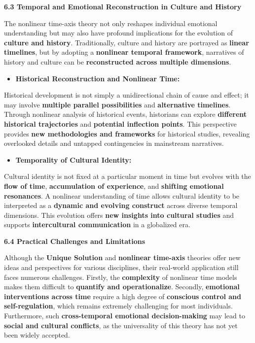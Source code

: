 \documentclass[
]{article}
\begin{document}
\textbf{6.3 Temporal and Emotional Reconstruction in Culture and
History}

The nonlinear time-axis theory not only reshapes individual emotional
understanding but may also have profound implications for the evolution
of \textbf{culture and history}. Traditionally, culture and history are
portrayed as \textbf{linear timelines}, but by adopting a
\textbf{nonlinear temporal framework}, narratives of history and culture
can be \textbf{reconstructed across multiple dimensions}.

\begin{itemize}
\item
  \textbf{Historical Reconstruction and Nonlinear Time:}
\end{itemize}

Historical development is not simply a unidirectional chain of cause and
effect; it may involve \textbf{multiple parallel possibilities} and
\textbf{alternative timelines}. Through nonlinear analysis of historical
events, historians can explore \textbf{different historical
trajectories} and \textbf{potential inflection points}. This perspective
provides \textbf{new methodologies and frameworks} for historical
studies, revealing overlooked details and untapped contingencies in
mainstream narratives.

\begin{itemize}
\item
  \textbf{Temporality of Cultural Identity:}
\end{itemize}

Cultural identity is not fixed at a particular moment in time but
evolves with the \textbf{flow of time}, \textbf{accumulation of
experience}, and \textbf{shifting emotional resonances}. A nonlinear
understanding of time allows cultural identity to be interpreted as a
\textbf{dynamic and evolving construct} across diverse temporal
dimensions. This evolution offers \textbf{new insights into cultural
studies} and supports \textbf{intercultural communication} in a
globalized era.

\textbf{6.4 Practical Challenges and Limitations}

Although the \textbf{Unique Solution} and \textbf{nonlinear time-axis}
theories offer new ideas and perspectives for various disciplines, their
real-world application still faces numerous challenges. Firstly, the
\textbf{complexity} of nonlinear time models makes them difficult to
\textbf{quantify and operationalize}. Secondly, \textbf{emotional
interventions across time} require a high degree of \textbf{conscious
control and self-regulation}, which remains extremely challenging for
most individuals. Furthermore, such \textbf{cross-temporal emotional
decision-making} may lead to \textbf{social and cultural conflicts}, as
the universality of this theory has not yet been widely accepted.
\end{document}
